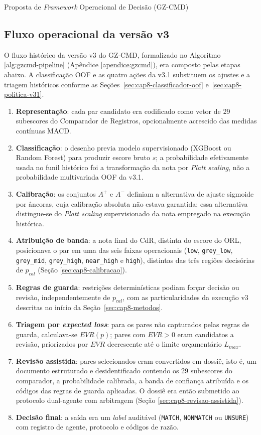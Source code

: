 \begin{chapter}{Proposta de \textit{Framework} Operacional de Decisão (GZ-CMD)}
\subsection{Fluxo operacional da versão v3}
\label{sec:cap8-fluxo}

O fluxo histórico da versão v3 do GZ-CMD, formalizado no Algoritmo \ref{alg:gzcmd-pipeline} (Apêndice \ref{apendice:gzcmd}), era composto pelas etapas abaixo. A classificação OOF e as quatro ações da v3.1 substituem os ajustes e a triagem históricos conforme as Seções~\ref{sec:cap8-classificador-oof} e~\ref{sec:cap8-politica-v31}.

\begin{enumerate}
\item \textbf{Representação}: cada par candidato era codificado como vetor de 29 subescores do Comparador de Registros, opcionalmente acrescido das medidas contínuas MACD.
\item \textbf{Classificação}: o desenho previa modelo supervisionado (XGBoost ou Random Forest) para produzir escore bruto $s$; a probabilidade efetivamente usada no funil histórico foi a transformação da nota por \textit{Platt scaling}, não a probabilidade multivariada OOF da v3.1.
\item \textbf{Calibração}: os conjuntos $A^+$ e $A^-$ definiam a alternativa de ajuste sigmoide por âncoras, cuja calibração absoluta não estava garantida; essa alternativa distingue-se do \textit{Platt scaling} supervisionado da nota empregado na execução histórica.
\item \textbf{Atribuição de banda}: a nota final do CdR, distinta do escore do ORL, posicionava o par em uma das seis faixas operacionais (\texttt{low}, \texttt{grey\_low}, \texttt{grey\_mid}, \texttt{grey\_high}, \texttt{near\_high} e \texttt{high}), distintas das três regiões decisórias de $p_{cal}$ (Seção \ref{sec:cap8-calibracao}).
\item \textbf{Regras de guarda}: restrições determinísticas podiam forçar decisão ou revisão, independentemente de $p_{cal}$, com as particularidades da execução v3 descritas no início da Seção~\ref{sec:cap8-metodos}.
\item \textbf{Triagem por \textit{expected loss}}: para os pares não capturados pelas regras de guarda, calculava-se $EVR(p)$; pares com $EVR>0$ eram candidatos a revisão, priorizados por $EVR$ decrescente até o limite orçamentário $L_{max}$.
\item \textbf{Revisão assistida}: pares selecionados eram convertidos em dossiê, isto é, um documento estruturado e desidentificado contendo os 29 subescores do comparador, a probabilidade calibrada, a banda de confiança atribuída e os códigos das regras de guarda aplicadas. O dossiê era então submetido ao protocolo dual-agente com arbitragem (Seção \ref{sec:cap8-revisao-assistida}).
\item \textbf{Decisão final}: a saída era um \textit{label} auditável (\texttt{MATCH}, \texttt{NONMATCH} ou \texttt{UNSURE}) com registro de agente, protocolo e códigos de razão.
\end{enumerate}


\end{chapter}
